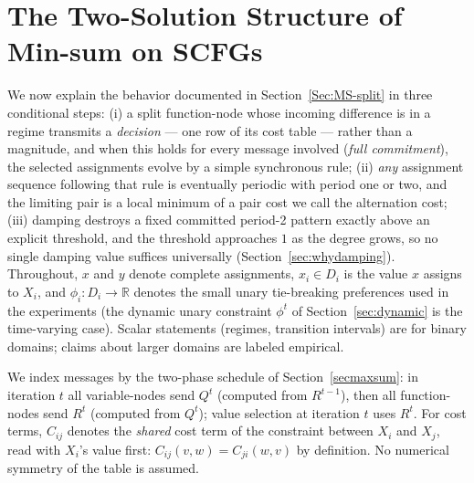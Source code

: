 \section{The Two-Solution Structure of Min-sum on SCFGs}\label{sec:tworoutes}

We now explain the behavior documented in Section~\ref{Sec:MS-split} in
three conditional steps: (i) a split function-node whose incoming
difference is in a regime transmits a \emph{decision} --- one row of its
cost table --- rather than a magnitude, and when this holds for every
message involved (\emph{full commitment}), the selected assignments evolve
by a simple synchronous rule; (ii) \emph{any} assignment sequence
following that rule is eventually periodic with period one or two, and the
limiting pair is a local minimum of a pair cost we call the alternation
cost; (iii) damping destroys a fixed committed period-2 pattern exactly
above an explicit threshold, and the threshold approaches $1$ as the
degree grows, so no single damping value suffices universally
(Section~\ref{sec:whydamping}).  Throughout, $x$ and $y$ denote complete
assignments, $x_i \in D_i$ is the value $x$ assigns to $X_i$, and
$\phi_i : D_i \to \mathbb{R}$ denotes the small unary tie-breaking
preferences used in the experiments (the dynamic unary constraint
$\phi^t$ of Section~\ref{sec:dynamic} is the time-varying case).  Scalar
statements (regimes, transition intervals) are for binary domains; claims
about larger domains are labeled empirical.

\begin{remark}\label{rem:conv}
We index messages by the two-phase schedule of
Section~\ref{secmaxsum}: in iteration $t$ all variable-nodes send
$Q^{t}$ (computed from $R^{t-1}$), then all function-nodes send $R^{t}$
(computed from $Q^{t}$); value selection at iteration $t$ uses $R^{t}$.
For cost terms, $C_{ij}$ denotes the \emph{shared} cost term of the
constraint between $X_i$ and $X_j$, read with $X_i$'s value first:
$C_{ij}(v, w) = C_{ji}(w, v)$ by definition.  No numerical symmetry of
the table is assumed.
\end{remark}

